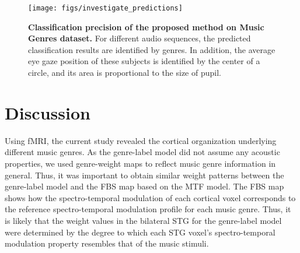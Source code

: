 \documentclass[journal]{IEEEtran}
\begin{document}
\begin{figure}[t]
	\centering
	\texttt{[image: figs/investigate\_predictions]}
	\caption{
		\textbf{
			Classification precision of the proposed method on Music Genres dataset. 
		}
		For different audio sequences, the predicted classification results are identified by genres.
		In addition, the average eye gaze position of these subjects is identified by the center of a circle, and its area is proportional to the size of pupil.
	}
	\label{fig:investigate_predictions}
\end{figure}











\section{Discussion}
\label{sec:discussion}

Using fMRI, the current study revealed the cortical organization underlying different music genres.
As the genre-label model did not assume any acoustic properties, we used genre-weight maps to reflect music genre information in general.
Thus, it was important to obtain similar weight patterns between the genre-label model and the FBS map based on the MTF model.
The FBS map shows how the spectro-temporal modulation of each cortical voxel corresponds to the reference spectro-temporal modulation profile for each music genre.
Thus, it is likely that the weight values in the bilateral STG for the genre-label model were determined by the degree to which each STG voxel's spectro-temporal modulation property resembles that of the music stimuli.
\end{document}
